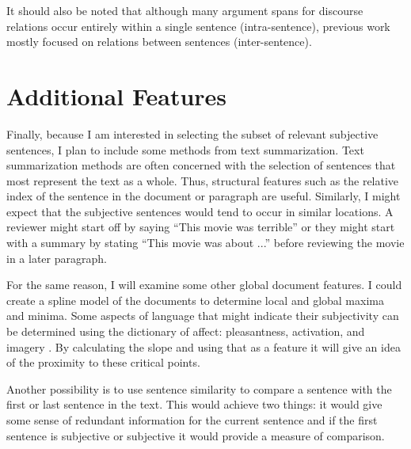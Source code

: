\documentclass[11pt,letterpaper]{article}
\begin{document}
It should also be noted that although many argument spans for discourse relations occur entirely within a single sentence (intra-sentence), previous work mostly
focused on relations between sentences (inter-sentence).

\section{Additional Features}

Finally, because I am interested in selecting the subset of relevant subjective sentences, I plan to include some methods from text summarization.  Text summarization methods
are often concerned with the selection of sentences that most represent the text as a whole.  Thus, structural features such as the relative index of the sentence in the document or paragraph 
are useful. Similarly, I might expect that the subjective sentences would tend to occur in similar locations.  A reviewer might start off by saying ``This movie was terrible'' or they might start with a summary by stating ``This movie was about ...'' before reviewing the movie in a later paragraph.

For the same reason, I will examine some other global document features.  I could create a spline model of the documents to determine
 local and global maxima and minima.  Some aspects of language that might indicate their subjectivity can be determined using the dictionary of affect: 
pleasantness, activation, and imagery \cite{Whissell}.  By calculating the slope and using that as a feature it will give an idea of the proximity to these critical points.

Another possibility is to use sentence similarity \cite{Guo} to compare a sentence with the first or last sentence in the text.  This would achieve two things: it would give some
sense of redundant information for the current sentence and if the first sentence is subjective or subjective it would provide a measure of comparison.
\end{document}
